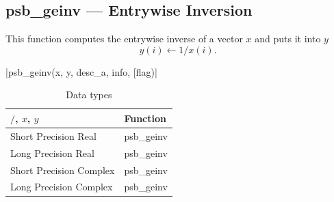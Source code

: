 \clearpage\subsection{psb\_geinv --- Entrywise Inversion}

This function computes the entrywise inverse of a vector $x$ and puts it into
$y$
\[y(i) \leftarrow 1/x(i).\]

\fortinline|psb_geinv(x, y, desc_a, info, [flag)|

\begin{table}[h]
	\begin{center}
		\begin{tabular}{ll}
			\hline
			$/$, $x$, $y$ & {\bf Function}\\
			\hline
			Short Precision Real & psb\_geinv \\
			Long Precision Real & psb\_geinv \\
			Short Precision Complex & psb\_geinv \\
			Long Precision Complex & psb\_geinv \\
			\hline
		\end{tabular}
	\end{center}
	\caption{Data types\label{tab:f90inv}}
\end{table}

